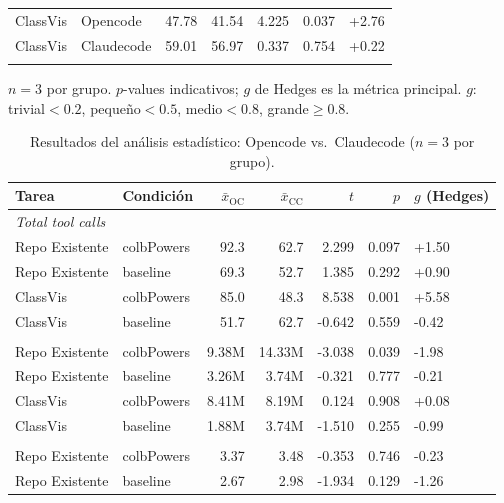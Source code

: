 \begin{table}[ht]
\begin{tabular}{llrrrrl}
    \quad ClassVis & Opencode & 47.78 & 41.54 & 4.225 & 0.037 & +2.76 \\
    \quad ClassVis & Claudecode & 59.01 & 56.97 & 0.337 & 0.754 & +0.22 \\
    \addlinespace
    \bottomrule
  \end{tabular}
  \begin{tablenotes}
    \small \item $n=3$ por grupo. $p$-values indicativos; $g$ de Hedges es la métrica principal. $g$: trivial${<}0.2$, pequeño${<}0.5$, medio${<}0.8$, grande${\geq}0.8$.
  \end{tablenotes}
\end{table}

\begin{table}[ht]
  \centering
  \caption{Resultados del análisis estadístico: Opencode vs.\ Claudecode ($n=3$ por grupo).}
  \label{tab:ttest_occc}
  \begin{tabular}{llrrrrl}
    \toprule
    Tarea & Condición & $\bar{x}_\text{OC}$ & $\bar{x}_\text{CC}$ & $t$ & $p$ & $g$ (Hedges) \\
    \midrule
    \multicolumn{7}{l}{\textit{Total tool calls}} \\
    \quad Repo Existente & colbPowers & 92.3 & 62.7 & 2.299 & 0.097 & +1.50 \\
    \quad Repo Existente & baseline & 69.3 & 52.7 & 1.385 & 0.292 & +0.90 \\
    \quad ClassVis & colbPowers & 85.0 & 48.3 & 8.538 & 0.001 & +5.58 \\
    \quad ClassVis & baseline & 51.7 & 62.7 & -0.642 & 0.559 & -0.42 \\
    \addlinespace
    \multicolumn{7}{l}{\textit{Total tokens}} \\
    \quad Repo Existente & colbPowers & 9.38M & 14.33M & -3.038 & 0.039 & -1.98 \\
    \quad Repo Existente & baseline & 3.26M & 3.74M & -0.321 & 0.777 & -0.21 \\
    \quad ClassVis & colbPowers & 8.41M & 8.19M & 0.124 & 0.908 & +0.08 \\
    \quad ClassVis & baseline & 1.88M & 3.74M & -1.510 & 0.255 & -0.99 \\
    \addlinespace
    \multicolumn{7}{l}{\textit{Avg. cyclomatic complexity}} \\
    \quad Repo Existente & colbPowers & 3.37 & 3.48 & -0.353 & 0.746 & -0.23 \\
    \quad Repo Existente & baseline & 2.67 & 2.98 & -1.934 & 0.129 & -1.26 \\

\end{tabular}
\end{table}
